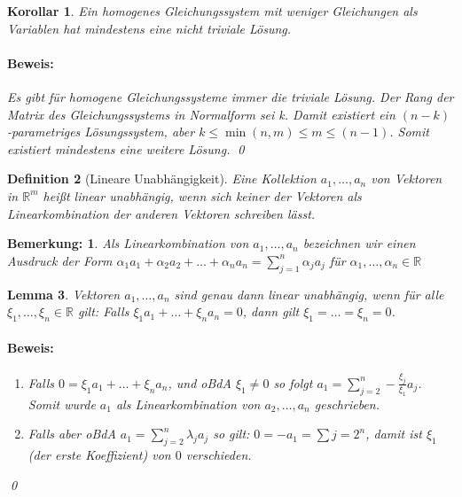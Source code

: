 \documentclass{report}
\newcommand{\IN}[1]{\index{#1|BH}}
\newcommand{\lb}{\lambda}
\newcommand{\R}{\mathbb{R}}
\newcommand{\al}{\alpha}
\theoremstyle{customrem}
\newtheorem*{bemerkung}{Bemerkung\textnormal:}
\theoremstyle{customdef}
\newtheorem{definition}{Definition}[chapter]
\newtheorem{lemma}[definition]{Lemma}
\newtheorem{korrolar}[definition]{Korollar}
\renewenvironment{proof}{\paragraph{Beweis: }}{\qed}
\begin{document}
	\begin{korrolar}
		\label{kor5}
		Ein homogenes Gleichungssystem mit weniger Gleichungen als Variablen hat mindestens eine nicht triviale Lösung.\\
		\begin{proof}
			Es gibt für homogene Gleichungssysteme immer die triviale Lösung. Der Rang der Matrix des Gleichungssystems in Normalform sei k. Damit existiert ein \((n-k)\)-parametriges Lösungssystem, aber \(k \le \min(n, m) \le m \le (n-1)\). Somit existiert mindestens eine weitere Lösung.
		\end{proof}
	\end{korrolar}
	\vspace{.2cm}
	\begin{definition}[Lineare Unabhängigkeit]
		\IN{Lineare Unabhängigkeit}
		\label{deflineareunab}
		Eine Kollektion \(a_1, \dots, a_n\) von Vektoren in \(\R^m\) heißt linear unabhängig, wenn sich keiner der Vektoren als Linearkombination der anderen Vektoren schreiben lässt.
	\end{definition}
	
	\begin{bemerkung}
		Als Linearkombination von \(a_1, \dots, a_n\) bezeichnen  wir einen Ausdruck der Form \(\al_1a_1 + \al_2 a_2 + \ldots + \al_n a_n = \sum_{j=1}^n \al_j a_j\) für \(\al_1, \dots, \al_n \in \R\)
	\end{bemerkung}
	
	\begin{lemma}
		\label{lem10}
		Vektoren \(a_1, \dots, a_n\) sind genau dann linear unabhängig, wenn für alle \(\xi_1, \dots, \xi_n \in\R\) gilt: Falls \(\xi_1a_1 + \dots + \xi_na_n = 0\), dann gilt \(\xi_1 = \dots = \xi_n = 0\).\\
		\begin{proof}
			\begin{enumerate}
				\itemsep-.125cm
				\item Falls \(0 = \xi_1 a_1 + \dots + \xi_n a_n\), und oBdA \(\xi_1 \neq 0\) so folgt \(a_1 = \sum_{j=2}^n -\frac{\xi_j}{\xi_1} a_j\). Somit wurde \(a_1\) als Linearkombination von \(a_2, \dots, a_n\) geschrieben.
				\item Falls aber oBdA \(a_1 = \sum_{j=2}^n \lb_j a_j\) so gilt: \(0 = -a_1 = \sum{j=2}^n\), damit ist \(\xi_1\) (der erste Koeffizient) von \(0\) verschieden.
			\end{enumerate}
		\end{proof}
	\end{lemma}
	
\end{document}
